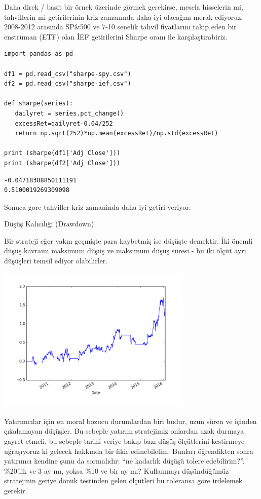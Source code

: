 \documentclass[12pt,fleqn]{article}\usepackage{../../common}
\begin{document}
Daha direk / basit bir örnek üzerinde görmek gerekirse, mesela hisselerin
mi, tahvillerin mi getirilerinin kriz zamanında daha iyi olacağını merak
ediyoruz. 2008-2012 arasında SP\&500 ve 7-10 senelik tahvil fiyatlarını
takip eden bir enstrüman (ETF) olan İEF getirilerini Sharpe oranı
ile karşılaştırabiriz.

\begin{verbatim}
import pandas as pd

df1 = pd.read_csv("sharpe-spy.csv")
df2 = pd.read_csv("sharpe-ief.csv")

def sharpe(series):
   dailyret = series.pct_change()
   excessRet=dailyret-0.04/252
   return np.sqrt(252)*np.mean(excessRet)/np.std(excessRet)

print (sharpe(df1['Adj Close']))
print (sharpe(df2['Adj Close']))
\end{verbatim}

\begin{verbatim}
-0.04718388850111191
0.5100019269309098
\end{verbatim}

Sonuca gore tahviller kriz zamaninda daha iyi getiri veriyor.

Düşüş Kalıcılığı (Drawdown)

Bir strateji eğer yakın geçmişte para kaybetmiş ise düşüşte demektir. İki
önemli düşüş kavramı maksimum düşüş ve maksimum düşüş süresi - bu iki ölçüt
ayrı düşüşleri temsil ediyor olabilirler.

\includegraphics[height=7cm]{tser_back_02.png}

Yatırımcılar için en moral bozucu durumlardan biri budur, uzun süren ve
içinden çıkalamayan düşüşler. Bu sebeple yatırım stratejimiz onlardan
uzak durmaya gayret etmeli, bu sebeple tarihi veriye bakıp bazı düşüş
ölçütlerini kestirmeye uğraşıyoruz ki gelecek hakkında bir fikir
edinebilelim. Bunları öğrendikten sonra yatırımcı kendine şunu da
sormalıdır: ``ne kadarlık düşüşü tolere edebilirim?''. \%20'lik ve 3 ay mı,
yoksa \%10 ve bir ay mı?  Kullanmayı düşündüğümüz stratejinin geriye dönük
testinden gelen ölçütleri bu toleransa göre irdelemek gerekir.
\end{document}
